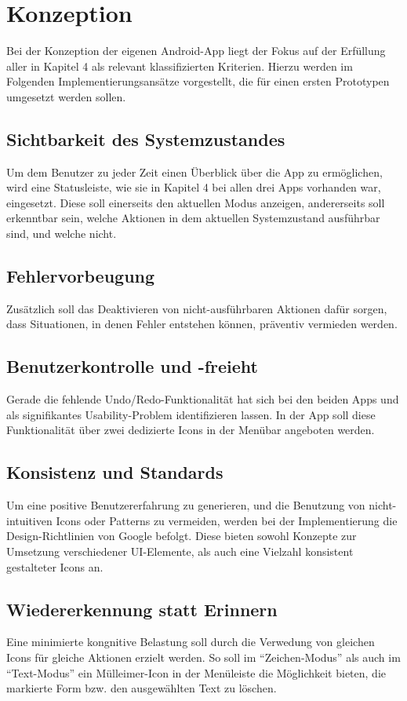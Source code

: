 \chapter{Konzeption}

Bei der Konzeption der eigenen Android-App liegt der Fokus auf der Erfüllung aller in Kapitel 4 als relevant klassifizierten Kriterien.
Hierzu werden im Folgenden Implementierungsansätze vorgestellt, die für einen ersten Prototypen umgesetzt werden sollen.

\section{Sichtbarkeit des Systemzustandes}
Um dem Benutzer zu jeder Zeit einen Überblick über die App zu ermöglichen, wird eine Statusleiste, wie sie in Kapitel 4 bei allen drei Apps vorhanden war, eingesetzt.
Diese soll einerseits den aktuellen Modus anzeigen, andererseits soll erkenntbar sein, welche Aktionen in dem aktuellen Systemzustand ausführbar sind, und welche nicht.

\section{Fehlervorbeugung}
Zusätzlich soll das Deaktivieren von nicht-ausführbaren Aktionen dafür sorgen, dass Situationen, in denen Fehler entstehen können, präventiv vermieden werden.

\section{Benutzerkontrolle und -freieht}
Gerade die fehlende Undo/Redo-Funktionalität hat sich bei den beiden Apps \pm{} und \ms{} als signifikantes Usability-Problem identifizieren lassen.
In der App soll diese Funktionalität über zwei dedizierte Icons in der Menübar angeboten werden.

\section{Konsistenz und Standards}
Um eine positive Benutzererfahrung zu generieren, und die Benutzung von nicht-intuitiven Icons oder Patterns zu vermeiden, werden bei der Implementierung die Design-Richtlinien von Google befolgt.
Diese bieten sowohl Konzepte zur Umsetzung verschiedener UI-Elemente, als auch eine Vielzahl konsistent gestalteter Icons an. 

\section{Wiedererkennung statt Erinnern}
Eine minimierte kongnitive Belastung soll durch die Verwedung von gleichen Icons für gleiche Aktionen erzielt werden.
So soll im ``Zeichen-Modus'' als auch im ``Text-Modus'' ein Mülleimer-Icon in der Menüleiste die Möglichkeit bieten, die markierte Form bzw. den ausgewählten Text zu löschen.

